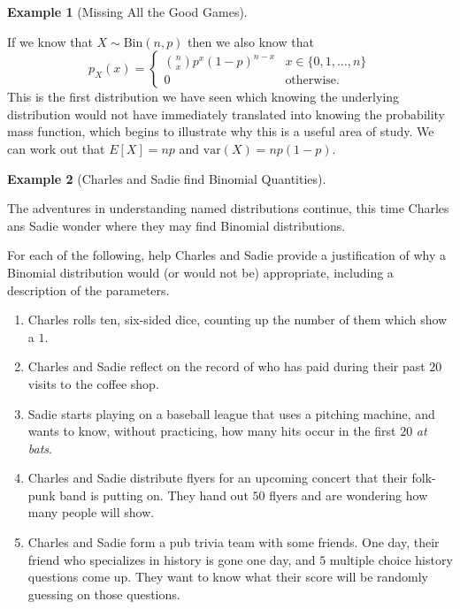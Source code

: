 \documentclass[
  letterpaper,
  DIV=11,
  numbers=noendperiod]{scrreprt}
\providecommand{\tightlist}{%
  \setlength{\itemsep}{0pt}\setlength{\parskip}{0pt}}\usepackage{longtable,booktabs,array}
\theoremstyle{definition}
\theoremstyle{definition}
\newtheorem{example}{Example}[chapter]
\theoremstyle{definition}
\theoremstyle{remark}
\begin{document}
\begin{example}[Missing All the Good
Games]
\begin{tcolorbox}[enhanced jigsaw, colback=white, colframe=quarto-callout-color-frame, arc=.35mm, leftrule=.75mm, rightrule=.15mm, opacityback=0, breakable, bottomrule=.15mm, left=2mm, toprule=.15mm]
\end{tcolorbox}

\end{example}

If we know that \(X\sim\text{Bin}(n,p)\) then we also know that
\[p_X(x) = \begin{cases} \binom{n}{x}p^x(1-p)^{n-x} & x\in\{0,1,\dots,n\} \\ 0 &\text{otherwise}.\end{cases}\]
This is the first distribution we have seen which knowing the underlying
distribution would not have immediately translated into knowing the
probability mass function, which begins to illustrate why this is a
useful area of study. We can work out that \(E[X] = np\) and
\(\text{var}(X) = np(1-p)\).

\begin{example}[Charles and Sadie find Binomial
Quantities]\protect\hypertarget{exm-binomial-list}{}\label{exm-binomial-list}

The adventures in understanding named distributions continue, this time
Charles ans Sadie wonder where they may find Binomial distributions.

For each of the following, help Charles and Sadie provide a
justification of why a Binomial distribution would (or would not be)
appropriate, including a description of the parameters.

\begin{enumerate}
\def\labelenumi{\alph{enumi}.}
\tightlist
\item
  Charles rolls ten, six-sided dice, counting up the number of them
  which show a \(1\).
\item
  Charles and Sadie reflect on the record of who has paid during their
  past \(20\) visits to the coffee shop.
\item
  Sadie starts playing on a baseball league that uses a pitching
  machine, and wants to know, without practicing, how many hits occur in
  the first \(20\) \emph{at bats}.
\item
  Charles and Sadie distribute flyers for an upcoming concert that their
  folk-punk band is putting on. They hand out \(50\) flyers and are
  wondering how many people will show.
\item
  Charles and Sadie form a pub trivia team with some friends. One day,
  their friend who specializes in history is gone one day, and \(5\)
  multiple choice history questions come up. They want to know what
  their score will be randomly guessing on those questions.
\end{enumerate}


\end{example}
\end{document}
